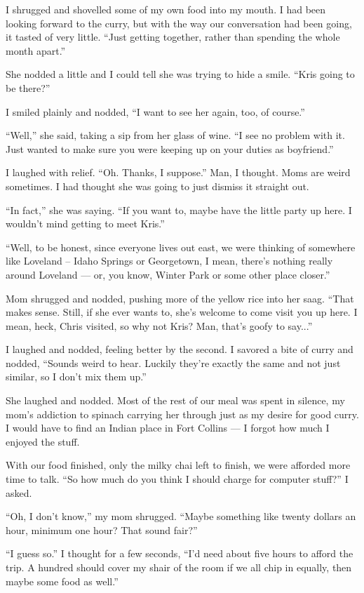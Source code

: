 I shrugged and shovelled some of my own food into my mouth.  I had been looking forward to the curry, but with the way our conversation had been going, it tasted of very little.  ``Just getting together, rather than spending the whole month apart.''

She nodded a little and I could tell she was trying to hide a smile.  ``Kris going to be there?''

I smiled plainly and nodded, ``I want to see her again, too, of course.''

``Well,'' she said, taking a sip from her glass of wine.  ``I see no problem with it.  Just wanted to make sure you were keeping up on your duties as boyfriend.''

I laughed with relief.  ``Oh.  Thanks, I suppose.''  Man, I thought.  Moms are weird sometimes.  I had thought she was going to just dismiss it straight out.

``In fact,'' she was saying.  ``If you want to, maybe have the little party up here.  I wouldn't mind getting to meet Kris.''

``Well, to be honest, since everyone lives out east, we were thinking of somewhere like Loveland -- Idaho Springs or Georgetown, I mean, there's nothing really around Loveland --- or, you know, Winter Park or some other place closer.''

Mom shrugged and nodded, pushing more of the yellow rice into her saag.  ``That makes sense.  Still, if she ever wants to, she's welcome to come visit you up here.  I mean, heck, Chris visited, so why not Kris?  Man, that's goofy to say...''

I laughed and nodded, feeling better by the second.  I savored a bite of curry and nodded, ``Sounds weird to hear.  Luckily they're exactly the same and not just similar, so I don't mix them up.''

She laughed and nodded.  Most of the rest of our meal was spent in silence, my mom's addiction to spinach carrying her through just as my desire for good curry.  I would have to find an Indian place in Fort Collins --- I forgot how much I enjoyed the stuff.

With our food finished, only the milky chai left to finish, we were afforded more time to talk.  ``So how much do you think I should charge for computer stuff?'' I asked.

``Oh, I don't know,'' my mom shrugged.  ``Maybe something like twenty dollars an hour, minimum one hour?  That sound fair?''

``I guess so.''  I thought for a few seconds, ``I'd need about five hours to afford the trip.  A hundred should cover my shair of the room if we all chip in equally, then maybe some food as well.''


